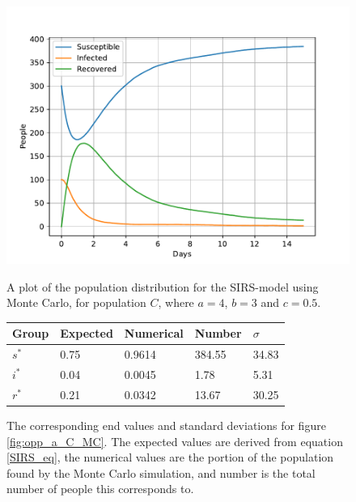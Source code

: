\documentclass[a4paper]{article}
\begin{document}
	\begin{figure}[!htb]
		\centering
		\begin{minipage}{0.49\textwidth}
			\centering
			\includegraphics[scale=0.6]{../plots/opp_a_C_MC.pdf}
			\caption{A plot of the population distribution for the SIRS-model using Monte Carlo, for population $C$, where $a=4$, $b=3$ and $c=0.5$. }\label{fig:opp_a_C_MC}
		\end{minipage}
		\begin{minipage}{0.49\textwidth}
			\centering
			\captionsetup{type=table} %
			\begin{tabular}{|l|l|l|l|l|}
				\hline
				Group & Expected & Numerical   & Number  & $\sigma$\\ \hline
				$s^*$ & 0.75 & 0.9614 & 384.55 & 34.83\\ \hline
				$i^*$ & 0.04 & 0.0045 & 1.78 & 5.31\\ \hline
				$r^*$ & 0.21 & 0.0342 & 13.67 & 30.25\\ \hline
			\end{tabular}
			\caption{The corresponding end values and standard deviations for figure \ref{fig:opp_a_C_MC}. The expected values are derived from equation \ref{SIRS_eq}, the numerical values are the portion of the population found by the Monte Carlo simulation, and number is the total number of people this corresponds to.}\label{tab:opp_a_C_mc}
		\end{minipage}
	\end{figure}
	
\end{document}
